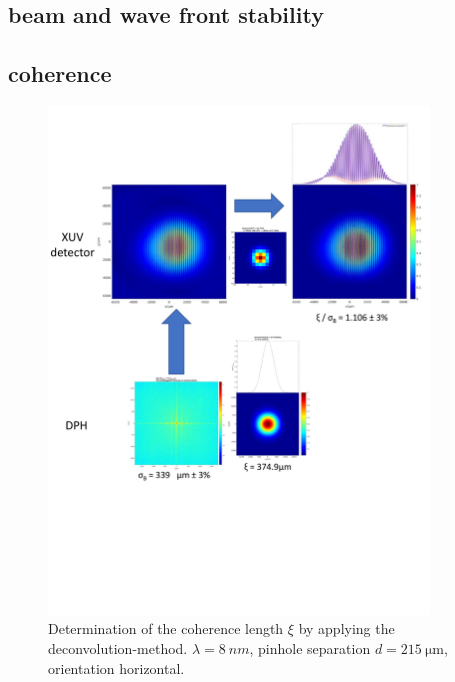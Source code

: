 \documentclass{osa-article}
\begin{document}
\subsection{beam and wave front stability}




\subsection{coherence}
\begin{figure}[hbtp]
    \centering
    \includegraphics[width=0.9\textwidth]{gfx/deconvolution_example_8nm_215_hor.pdf}
    \caption{Determination of the coherence length $\xi$ by applying the deconvolution-method. $\lambda=\SI{8}{nm}$, pinhole separation $d=\SI{215}{\micro\meter}$, orientation horizontal.}
    \label{fig:deconvolution_example_8nm_215_hor}
\end{figure}
\end{document}
